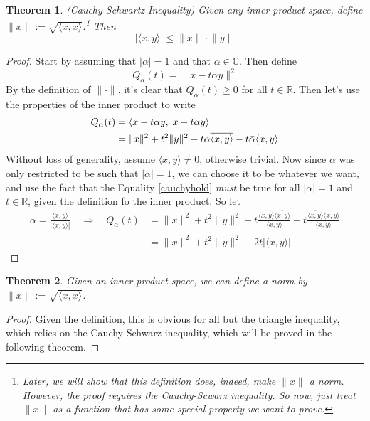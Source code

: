 \documentclass[12pt]{article}
\theoremstyle{plain}
\newtheorem{thm}{Theorem}[subsection]
\theoremstyle{definition}
\theoremstyle{remark}
\begin{document}
\begin{thm}
\label{thm.cauchyscwarz}
\emph{(Cauchy-Schwartz Inequality)}
Given any inner product space, define $\lVert x\rVert := \sqrt{\langle x,x\rangle}$.\footnote{Later, we will show that this definition does, indeed, make $\lVert x\rVert$ a norm.  However, the proof requires the Cauchy-Scwarz inequality. So now, just treat $\lVert x\rVert$ as a function that has some special property we want to prove.} Then
\[
    \lvert \langle x,y\rangle\rvert \leq \lVert x\rVert\cdot\lVert y\rVert
\]
\end{thm}
\begin{proof}
Start by assuming that $|\alpha|=1$ and that $\alpha\in\mathbb{C}$. Then define
\[
    Q_\alpha(t) = \lVert x - t\alpha y\rVert^2
\]
By the definition of $\lVert \cdot\rVert$, it's clear that $Q_\alpha(t)\geq 0$ for all $t\in\mathbb{R}$. Then let's use the properties of the inner product to write
\begin{align}
    Q_\alpha(t) &= \langle x -t\alpha y,\; x -t\alpha y\rangle \notag \\
    &= \lVert x\rVert^2 + t^2 \lVert y\rVert^2 
    - t\alpha \overline{\langle x,y\rangle}
    - t\bar{\alpha} {\langle x,y\rangle} \label{cauchyhold}
\end{align}
Without loss of generality, assume $\langle x,y\rangle\neq 0$, otherwise trivial. Now since $\alpha$ was only restricted to be such that $|\alpha|=1$, we can choose it to be whatever we want, and use the fact that the Equality \ref{cauchyhold} \emph{must} be true for all $|\alpha|=1$ and $t\in\mathbb{R}$, given the definition fo the inner product. So let
\begin{align*}
    \alpha = \frac{\langle x,y\rangle}{|\langle x,y\rangle|} 
    \quad\Rightarrow\quad
    Q_\alpha(t) &= \lVert x\rVert^2 + t^2 \lVert y\rVert^2 
    - t\frac{\langle x,y\rangle\overline{\langle x,y\rangle}}{\langle x,y\rangle} 
    - t\frac{\overline{\langle x,y\rangle}{\langle x,y\rangle}}{\langle x,y\rangle}  \\
    &= \lVert x\rVert^2 + t^2 \lVert y\rVert^2 
    -2t |\langle x,y\rangle|
\end{align*}
\end{proof}

\begin{thm}
Given an inner product space, we can define a norm by $\lVert x\rVert := \sqrt{\langle x,x\rangle}$.
\end{thm}
\begin{proof}
Given the definition, this is obvious for all but the triangle inequality, which relies on the Cauchy-Schwarz inequality, which will be proved in the following theorem.
\end{proof}
\end{document}
